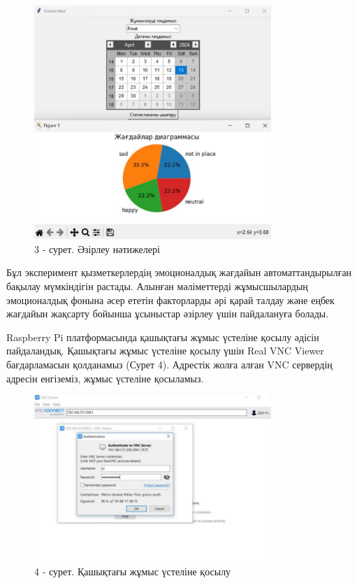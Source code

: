 \begin{figure}[H]
	\centering
	\includegraphics[width=0.8\textwidth]{media/ict2/image162}
	\caption*{3 - сурет. Әзірлеу нәтижелері}
\end{figure}



Бұл эксперимент қызметкерлердің эмоционалдық жағдайын автоматтандырылған
бақылау мүмкіндігін растады. Алынған мәліметтерді жұмысшылардың
эмоционалдық фонына әсер ететін факторларды әрі қарай талдау және еңбек
жағдайын жақсарту бойынша ұсыныстар әзірлеу үшін пайдалануға болады.

Raspberry Pi платформасында қашықтағы жұмыс үстеліне қосылу әдісін
пайдаландық. Қашықтағы жұмыс үстеліне қосылу үшін Real VNC Viewer
бағдарламасын қолданамыз (Сурет 4). Адрестік жолға алған VNC сервердің
адресін енгіземіз, жұмыс үстеліне қосыламыз.

\begin{figure}[H]
	\centering
	\includegraphics[width=0.8\textwidth]{media/ict2/image163}
	\caption*{4 - сурет. Қашықтағы жұмыс үстеліне қосылу}
\end{figure}

